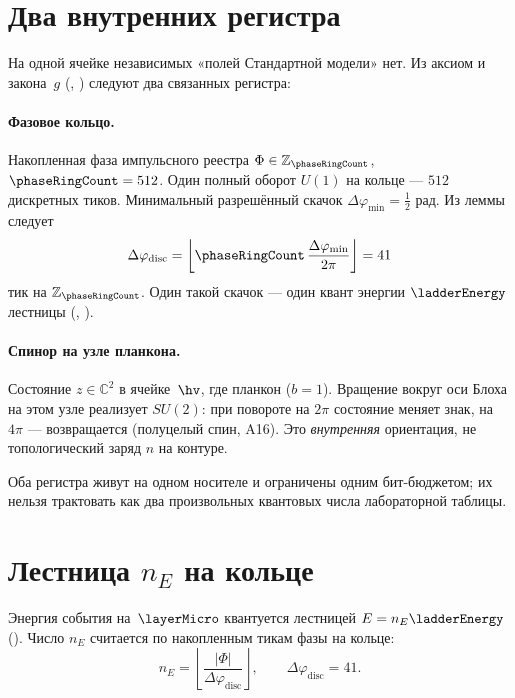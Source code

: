 \section{Два внутренних регистра}
\label{sec:floor0-registers}

На одной ячейке независимых «полей Стандартной модели» нет.
Из аксиом и закона~$g$ (, ) следуют два связанных регистра:

\paragraph{Фазовое кольцо.}
Накопленная фаза импульсного реестра
$\Phi\in\mathbb{Z}_{\phaseRingCount}$, $\phaseRingCount=512$.
Один полный оборот $U(1)$ на кольце --- $512$ дискретных тиков.
Минимальный разрешённый скачок $\Delta\varphi_{\min}=\tfrac12$ рад.
Из леммы~ следует
\[
  \Delta\varphi_{\mathrm{disc}}
  = \left\lfloor \phaseRingCount\,\frac{\Delta\varphi_{\min}}{2\pi}\right\rfloor
  = 41
\]
тик на $\mathbb{Z}_{\phaseRingCount}$.
Один такой скачок --- один квант энергии $\ladderEnergy$ лестницы (, ).

\paragraph{Спинор на узле планкона.}
Состояние $z\in\mathbb{C}^2$ в ячейке~$\hv$, где планкон ($b=1$).
Вращение вокруг оси Блоха на этом узле реализует $SU(2)$:
при повороте на $2\pi$ состояние меняет знак, на $4\pi$ --- возвращается
(полуцелый спин, A16).
Это \emph{внутренняя} ориентация, не топологический заряд $n$ на контуре.

Оба регистра живут на одном носителе и ограничены одним бит-бюджетом;
их нельзя трактовать как два произвольных квантовых числа лабораторной таблицы.

\section{Лестница $n_E$ на кольце}
\label{sec:floor0-ne-ladder}

Энергия события на~$\layerMicro$ квантуется лестницей $E=n_E \ladderEnergy$ ().
Число $n_E$ считается по накопленным тикам фазы на кольце:
\[
  n_E = \left\lfloor \frac{|\Phi|}{\Delta\varphi_{\mathrm{disc}}}\right\rfloor,
  \qquad
  \Delta\varphi_{\mathrm{disc}} = 41.
\]

